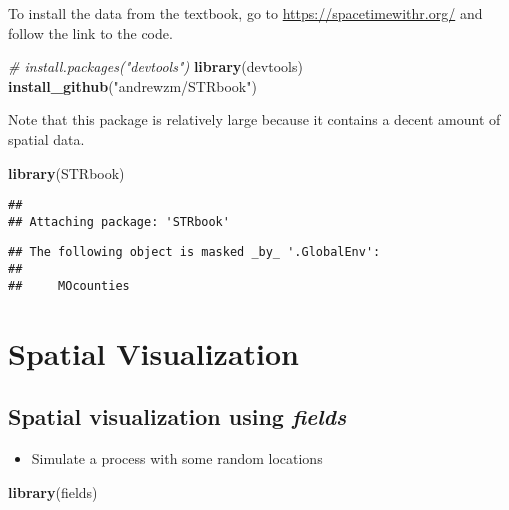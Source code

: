 \documentclass[]{book}
\newenvironment{Shaded}{\begin{snugshade}}{\end{snugshade}}
\newcommand{\CommentTok}[1]{\textcolor[rgb]{0.56,0.35,0.01}{\textit{#1}}}
\newcommand{\KeywordTok}[1]{\textcolor[rgb]{0.13,0.29,0.53}{\textbf{#1}}}
\newcommand{\NormalTok}[1]{#1}
\newcommand{\StringTok}[1]{\textcolor[rgb]{0.31,0.60,0.02}{#1}}
\providecommand{\tightlist}{%
  \setlength{\itemsep}{0pt}\setlength{\parskip}{0pt}}
\begin{document}
To install the data from the textbook, go to \url{https://spacetimewithr.org/} and follow the link to the code.

\begin{Shaded}
\begin{Highlighting}[]
\CommentTok{# install.packages("devtools")}
\KeywordTok{library}\NormalTok{(devtools)}
\KeywordTok{install_github}\NormalTok{(}\StringTok{"andrewzm/STRbook"}\NormalTok{)}
\end{Highlighting}
\end{Shaded}

Note that this package is relatively large because it contains a decent amount of spatial data.

\begin{Shaded}
\begin{Highlighting}[]
\KeywordTok{library}\NormalTok{(STRbook)}
\end{Highlighting}
\end{Shaded}

\begin{verbatim}
## 
## Attaching package: 'STRbook'
\end{verbatim}

\begin{verbatim}
## The following object is masked _by_ '.GlobalEnv':
## 
##     MOcounties
\end{verbatim}

\hypertarget{spatial-visualization}{%
\section{Spatial Visualization}\label{spatial-visualization}}

\hypertarget{spatial-visualization-using-fields}{%
\subsection{\texorpdfstring{Spatial visualization using \emph{fields}}{Spatial visualization using fields}}\label{spatial-visualization-using-fields}}

\begin{itemize}
\tightlist
\item
  Simulate a process with some random locations
\end{itemize}

\begin{Shaded}
\begin{Highlighting}[]
\KeywordTok{library}\NormalTok{(fields)}
\end{Highlighting}
\end{Shaded}
\end{document}
